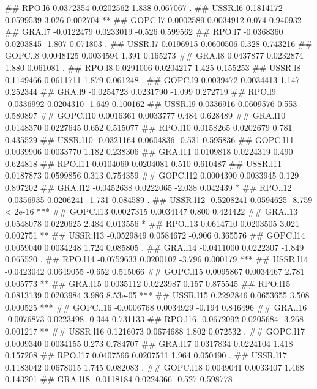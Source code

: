 \documentclass[
]{article}
\begin{document}
\begin{itemize}
## RPO.l6    0.0372354  0.0202562   1.838 0.067067 .  
## USSR.l6   0.1814172  0.0599539   3.026 0.002704 ** 
## GOPC.l7   0.0002589  0.0034912   0.074 0.940932    
## GRA.l7   -0.0122479  0.0233019  -0.526 0.599562    
## RPO.l7   -0.0368360  0.0203845  -1.807 0.071803 .  
## USSR.l7   0.0196915  0.0600506   0.328 0.743216    
## GOPC.l8   0.0048125  0.0034594   1.391 0.165273    
## GRA.l8    0.0437877  0.0232874   1.880 0.061081 .  
## RPO.l8    0.0291006  0.0204217   1.425 0.155253    
## USSR.l8   0.1149466  0.0611711   1.879 0.061248 .  
## GOPC.l9   0.0039472  0.0034413   1.147 0.252344    
## GRA.l9   -0.0254723  0.0231790  -1.099 0.272719    
## RPO.l9   -0.0336992  0.0204310  -1.649 0.100162    
## USSR.l9   0.0336916  0.0609576   0.553 0.580897    
## GOPC.l10  0.0016361  0.0033777   0.484 0.628489    
## GRA.l10   0.0148370  0.0227645   0.652 0.515077    
## RPO.l10   0.0158265  0.0202679   0.781 0.435529    
## USSR.l10 -0.0321164  0.0604836  -0.531 0.595836    
## GOPC.l11  0.0039906  0.0033770   1.182 0.238306    
## GRA.l11   0.0109818  0.0224319   0.490 0.624818    
## RPO.l11   0.0104069  0.0204081   0.510 0.610487    
## USSR.l11  0.0187873  0.0599856   0.313 0.754359    
## GOPC.l12  0.0004390  0.0033945   0.129 0.897202    
## GRA.l12  -0.0452638  0.0222065  -2.038 0.042439 *  
## RPO.l12  -0.0356935  0.0206241  -1.731 0.084589 .  
## USSR.l12 -0.5208241  0.0594625  -8.759  < 2e-16 ***
## GOPC.l13  0.0027315  0.0034147   0.800 0.424422    
## GRA.l13   0.0548078  0.0220625   2.484 0.013556 *  
## RPO.l13   0.0614710  0.0203505   3.021 0.002751 ** 
## USSR.l13 -0.0529849  0.0584672  -0.906 0.365576    
## GOPC.l14  0.0059040  0.0034248   1.724 0.085805 .  
## GRA.l14  -0.0411000  0.0222307  -1.849 0.065520 .  
## RPO.l14  -0.0759633  0.0200102  -3.796 0.000179 ***
## USSR.l14 -0.0423042  0.0649055  -0.652 0.515066    
## GOPC.l15  0.0095867  0.0034467   2.781 0.005773 ** 
## GRA.l15   0.0035112  0.0223987   0.157 0.875545    
## RPO.l15   0.0813139  0.0203984   3.986 8.53e-05 ***
## USSR.l15  0.2292846  0.0653655   3.508 0.000525 ***
## GOPC.l16 -0.0006768  0.0034929  -0.194 0.846496    
## GRA.l16  -0.0076873  0.0223498  -0.344 0.731133    
## RPO.l16  -0.0672092  0.0205684  -3.268 0.001217 ** 
## USSR.l16  0.1216073  0.0674688   1.802 0.072532 .  
## GOPC.l17  0.0009340  0.0034155   0.273 0.784707    
## GRA.l17   0.0317834  0.0224104   1.418 0.157208    
## RPO.l17   0.0407566  0.0207511   1.964 0.050490 .  
## USSR.l17  0.1183042  0.0678015   1.745 0.082083 .  
## GOPC.l18  0.0049041  0.0033407   1.468 0.143201    
## GRA.l18  -0.0118184  0.0224366  -0.527 0.598778    

\end{itemize}
\end{document}
